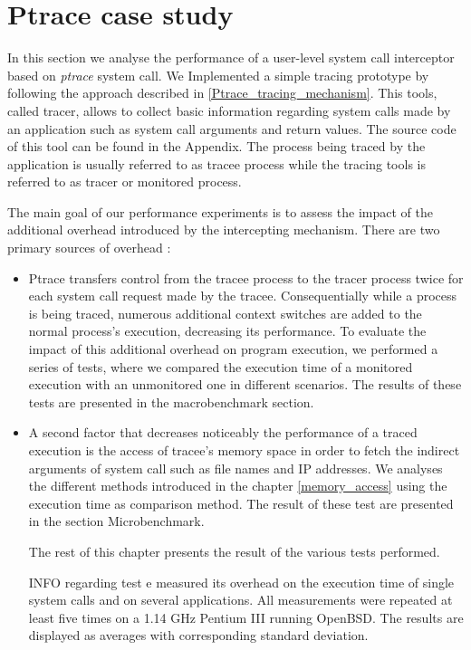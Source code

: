 \chapter{Ptrace  case study}

In this section we analyse the performance of a user-level system call interceptor based on \emph{ptrace} system call. We Implemented a simple tracing prototype   by following the approach described in \ref{Ptrace_tracing_mechanism}. This tools, called tracer, allows to collect basic information regarding system calls made by an application such as system call arguments and return values. The source code of this tool can be found in the Appendix. The process being traced by the application is usually referred to as tracee process while the tracing tools is referred to as tracer or monitored process. 

The main goal of our performance experiments is to assess the impact of the additional overhead introduced by the intercepting mechanism. There are two primary sources of overhead : 

\begin{itemize}
\item Ptrace transfers control from the tracee process to the tracer process twice for each system call request made by the 		  tracee. Consequentially while a process is being traced, numerous additional context switches are added to the normal 		  process's execution, decreasing its performance. To evaluate the impact of this additional overhead on program 		
	  execution, we performed a series of tests, where we compared the execution time of a monitored execution with an
	  unmonitored one in different scenarios. The results of these tests are presented in the macrobenchmark section.

\item A second factor that decreases noticeably the performance of a traced execution is the access of tracee's memory space in order to fetch the indirect arguments of system call such as file names and IP addresses. We analyses the different methods introduced in the chapter \ref{memory_access} using the execution time as comparison method. The result of these test are presented in the section Microbenchmark. 

The rest of this chapter presents the result of the various tests performed. 

INFO regarding test 
e measured its overhead on the execution time of
single system calls and on several applications. All
measurements were repeated at least five times on a
1.14 GHz Pentium III running OpenBSD. The results
are displayed as averages with corresponding standard
deviation.
\end{itemize}


